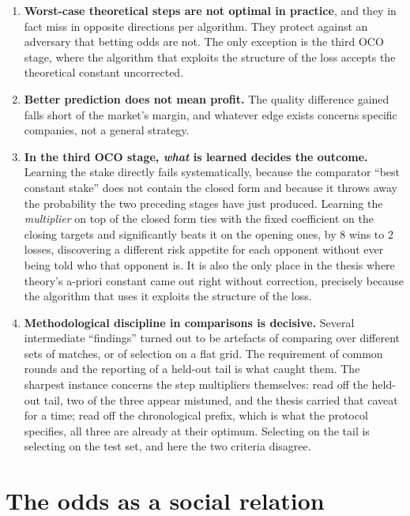 \documentclass[12pt,a4paper,oneside]{report}
\renewcommand{\_}{\oldunderscore\allowbreak}
\theoremstyle{definition}
\theoremstyle{plain}
\theoremstyle{remark}
\begin{document}
\begin{enumerate}
  \item \textbf{Worst-case theoretical steps are not optimal in practice}, and they in fact miss in
        opposite directions per algorithm. They protect against an adversary that betting odds are
        not. The only exception is the third OCO stage, where the algorithm that exploits the
        structure of the loss accepts the theoretical constant uncorrected.

  \item \textbf{Better prediction does not mean profit.} The quality difference gained falls short
        of the market's margin, and whatever edge exists concerns specific companies, not a general
        strategy.

  \item \textbf{In the third OCO stage, \emph{what} is learned decides the outcome.} Learning the
        stake directly fails systematically, because the comparator ``best constant stake'' does
        not contain the closed form and because it throws away the probability the two preceding
        stages have just produced. Learning the \emph{multiplier} on top of the closed form ties
        with the fixed coefficient on the closing targets and significantly beats it on the opening
        ones, by 8 wins to 2 losses, discovering a different risk appetite for each opponent
        without ever being told who that opponent is. It is also the only place in the thesis where
        theory's a-priori constant came out right without correction, precisely because the
        algorithm that uses it exploits the structure of the loss.

  \item \textbf{Methodological discipline in comparisons is decisive.} Several intermediate
        ``findings'' turned out to be artefacts of comparing over different sets of matches, or of
        selection on a flat grid. The requirement of common rounds and the reporting of a held-out
        tail is what caught them. The sharpest instance concerns the step multipliers themselves:
        read off the held-out tail, two of the three appear mistuned, and the thesis carried that
        caveat for a time; read off the chronological prefix, which is what the protocol specifies,
        all three are already at their optimum. Selecting on the tail is selecting on the test set,
        and here the two criteria disagree.
\end{enumerate}

\section{The odds as a social relation}
\label{sec:disc-material}
\end{document}
